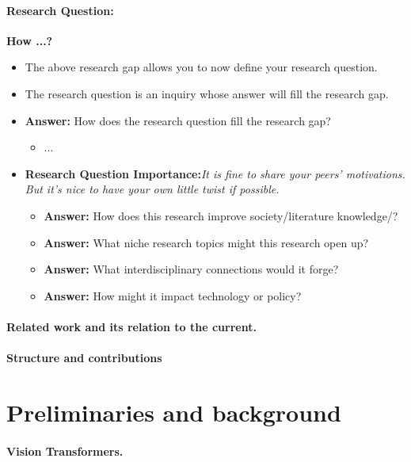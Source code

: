 \documentclass{article}
\begin{document}
{    \paragraph{Research Question:}\textcolor{OliveGreen}{\bf How ...?}
    \begin{itemize}
        \item The above research gap allows you to now define your research question.
        \item The research question is an inquiry whose answer will fill the research gap.
        \item \textbf{Answer:} How does the research question fill the research gap?
        \begin{itemize}
            \item ...
        \end{itemize}
        \item \textbf{Research Question Importance:}\textit{It is fine to share your peers' motivations. But it's nice to have your own little twist if possible.}
        \begin{itemize}
            \item \textbf{Answer:} How does this research improve society/literature knowledge/?
            \item \textbf{Answer:} What niche research topics might this research open up?
            \item \textbf{Answer:} What interdisciplinary connections would it forge?
            \item \textbf{Answer:} How might it impact technology or policy?
        \end{itemize}
    \end{itemize}
}

\paragraph{Related work and its relation to the current.}

\paragraph{Structure and contributions}

\section{Preliminaries and background}

\paragraph{Vision Transformers.}
\end{document}
